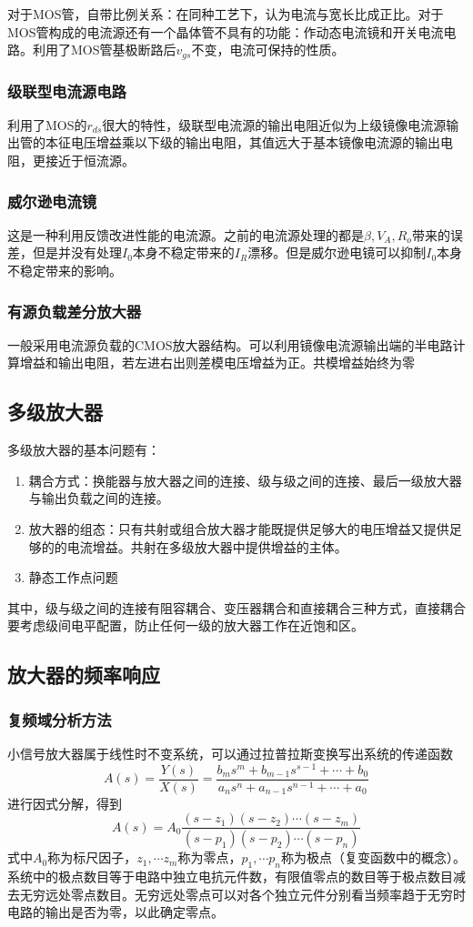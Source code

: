 \documentclass{ctexart}
\begin{document}
对于MOS管，自带比例关系：在同种工艺下，认为电流与宽长比成正比。对于MOS管构成的电流源还有一个晶体管不具有的功能：作动态电流镜和开关电流电路。利用了MOS管基极断路后$v_{gs}$不变，电流可保持的性质。
\subsubsection{级联型电流源电路}
利用了MOS的$r_{ds}$很大的特性，级联型电流源的输出电阻近似为上级镜像电流源输出管的本征电压增益乘以下级的输出电阻，其值远大于基本镜像电流源的输出电阻，更接近于恒流源。
\subsubsection{威尔逊电流镜}
这是一种利用反馈改进性能的电流源。之前的电流源处理的都是$\beta,V_A,R_o$带来的误差，但是并没有处理$I_0$本身不稳定带来的$I_R$漂移。但是威尔逊电镜可以抑制$I_0$本身不稳定带来的影响。
\subsubsection{有源负载差分放大器}
一般采用电流源负载的CMOS放大器结构。可以利用镜像电流源输出端的半电路计算增益和输出电阻，若左进右出则差模电压增益为正。共模增益始终为零
\subsection{多级放大器}
多级放大器的基本问题有：
\begin{enumerate}
    \item 耦合方式：换能器与放大器之间的连接、级与级之间的连接、最后一级放大器与输出负载之间的连接。
    \item 放大器的组态：只有共射或组合放大器才能既提供足够大的电压增益又提供足够的的电流增益。共射在多级放大器中提供增益的主体。
    \item 静态工作点问题
\end{enumerate}
其中，级与级之间的连接有阻容耦合、变压器耦合和直接耦合三种方式，直接耦合要考虑级间电平配置，防止任何一级的放大器工作在近饱和区。
\subsection{放大器的频率响应}
\subsubsection{复频域分析方法}
小信号放大器属于线性时不变系统，可以通过拉普拉斯变换写出系统的传递函数
\begin{equation}
    A(s)=\dfrac{Y(s)}{X(s)}=\dfrac{b_m s^m+b_{m-1}s^{s-1}+\cdots +b_0}{a_n s^n+a_{n-1}s^{n-1}+\cdots +a_0}
\end{equation}
进行因式分解，得到
\begin{equation}
    A(s)=A_0 \dfrac{(s-z_1)(s-z_2)\cdots (s-z_m)}{(s-p_1)(s-p_2)\cdots (s-p_n)}
\end{equation}
式中$A_0$称为标尺因子，$z_1,\cdots z_m$称为零点，$p_1,\cdots p_n$称为极点（复变函数中的概念）。系统中的极点数目等于电路中独立电抗元件数，有限值零点的数目等于极点数目减去无穷远处零点数目。无穷远处零点可以对各个独立元件分别看当频率趋于无穷时电路的输出是否为零，以此确定零点。
\end{document}
